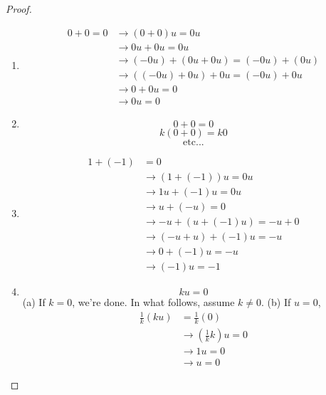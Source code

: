 \documentclass[12pt]{article}
\begin{document}
\begin{proof} \begin{enumerate} 
\item $$ \begin{aligned} 0 + 0 = 0 &\rightarrow (0 + 0)u = 0u \\ &\rightarrow 0u + 0u = 0u \\ &\rightarrow (-0u) + (0u + 0u) = (-0u) + (0u) \\ &\rightarrow ((-0u) + 0u) + 0u = (-0u) + 0u \\ &\rightarrow 0 + 0u = 0 \\ &\rightarrow 0u = 0 \end{aligned} $$ 
\item $$ 0 + 0 = 0 $$ $$ k(0 + 0) = k0 $$ $$ \text{etc...} $$ 
\item $$ \begin{aligned} 1 + (-1) &= 0 \\ &\rightarrow (1 + (-1))u = 0u \\ &\rightarrow 1u + (-1)u = 0u \\ &\rightarrow u + (-u) = 0 \\ &\rightarrow -u + (u + (-1)u) = -u + 0 \\ &\rightarrow (-u + u) + (-1)u = -u \\ &\rightarrow 0 + (-1)u = -u \\ & \rightarrow (-1)u = -1 \end{aligned} $$ 
\item $$ ku = 0$$ (a) If $ k = 0$, we're done. In what follows, assume $k \neq 0$. \newline (b) If $u = 0$, $$ \begin{aligned} \frac{1}{k}(ku) &= \frac{1}{k}(0) \\ &\rightarrow (\frac{1}{k}k)u = 0 \\ &\rightarrow 1u = 0 \\ & \rightarrow u = 0 \end{aligned} $$ \end{enumerate} \end{proof}
\end{document}
